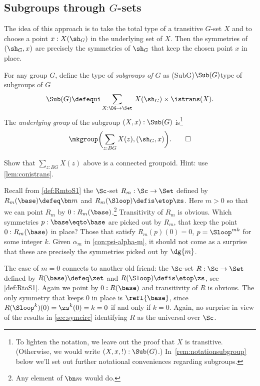 \subsection{Subgroups through $G$-sets}

The idea of this approach is to take the total type of a transitive
$G$-set $X$ and to choose a point $x:X(\sh_G)$ in the underlying set of $X$.
Then the symmetries of $(\sh_G,x)$ are precisely the symmetries of $\sh_G$
that keep the chosen point $x$ in place.

\begin{definition}\label{def:set-of-subgroups}
  For any group $G$, define the type of \emph{subgroups of $G$} as%
  \glossary(SubG){$\protect\Sub(G)$}{type of subgroups of $G$}
  \[
    \Sub(G)\defequi\sum_{X:\BG\to\Set}{\,}X(\sh_G)
    \times\istrans(X).
  \]
  The \emph{underlying group} of the subgroup $(X,x) : \Sub(G)$ is\footnote{%
    To lighten the notation, we leave out the proof that $X$ is transitive.
    (Otherwise, we would write $(X,x,!):\Sub(G)$.)
    In~\cref{rem:notationsubgroup} below we'll set out further notational
    conveniences regarding subgroups.}
  \[
    \mkgroup \biggl(\sum_{z:BG}X(z),(\sh_G,x)\biggr).\qedhere
  \]
\end{definition}

\begin{xca}\label{xca:group-Xx!}
Show that $\sum_{z:BG}X(z)$ above is a connected groupoid.
Hint: use \cref{lem:conistrans}.
\end{xca}

\begin{example}\label{ex:Rm0-subgroup} 
Recall from \cref{def:RmtoS1} the $\Sc$-set
$R_m : \Sc\to\Set$ defined by $R_m(\base) \defeq \bn m$ and
$R_m(\Sloop) \defis \etop\zs$. Here $m>0$ so that we can point
$R_m$ by $0: R_m(\base)$.\footnote{Any element of $\bn m$ would do.}
Transitivity of $R_m$ is obvious.
Which symmetries $p: \base\eqto\base$ are picked out by $R_m$,
that keep the point $0: R_m(\base)$ in place? Those that 
satisfy $R_m(p)(0)=0$, \ie $p=\Sloop^{mk}$ for some integer $k$.
Given $\alpha_m$ in \cref{con:psi-alpha-m}, it should not come as a
surprise that these are precisely the symmetries picked out by $\dg{m}$.

The case of $m=0$ connects to another old friend: the $\Sc$-set
$R : \Sc\to\Set$ defined by $R(\base) \defeq \zet$ and
$R(\Sloop) \defis \etop\zs$, see \cref{def:RtoS1}.
Again we point by $0: R(\base)$ and transitivity of $R$ is obvious.
The only symmetry that keeps $0$ in place is $\refl{\base}$,
since $R(\Sloop^k)(0) = \zs^k(0) = k = 0$ if and only if $k=0$.
Again, no surprise in view of the results in \cref{sec:symcirc}
identifying $R$ as the universal \covering over $\Sc$.
\end{example}

